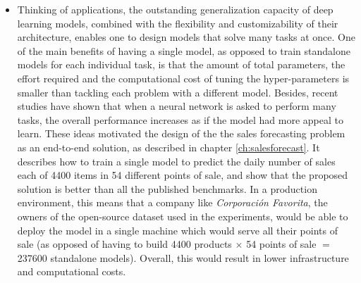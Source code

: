 \begin{itemize}
\item Thinking of applications, the outstanding generalization capacity of deep learning models, combined with the flexibility and customizability of their architecture, enables one to design models that solve many tasks at once. One of the main benefits of having a single model, as opposed to train standalone models for each individual task, is that the amount of total parameters, the effort required and the computational cost of tuning the hyper-parameters is smaller than tackling each problem with a different model. Besides, recent studies have shown that when a neural network is asked to perform many tasks, the overall performance increases \autocite{Jaderberg2016} as if the model had more appeal to learn. These ideas motivated the design of the the sales forecasting problem as an end-to-end solution, as described in chapter \ref{ch:salesforecast}. It describes how to train a single model to predict the daily number of sales each of 4400 items in 54 different points of sale, and show that the proposed solution is better than all the published benchmarks. In a production environment, this means that a company like \textit{Corporación Favorita}, the owners of the open-source dataset used in the experiments, would be able to deploy the model in a single machine which would serve all their points of sale (as opposed of having to build 4400 products $\times$ 54 points of sale $=$ 237600 standalone models). Overall, this would result in lower infrastructure and computational costs.


\end{itemize}
